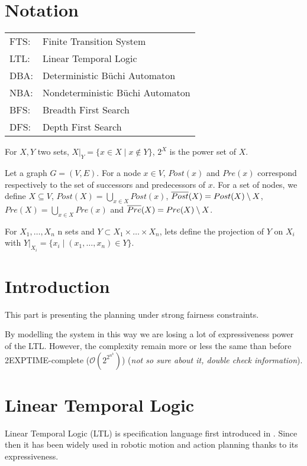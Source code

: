 \section*{Notation}
\begin{tabular}{ll}
FTS:& Finite Transition System\\
LTL:& Linear Temporal Logic\\
DBA:& Deterministic B\"uchi Automaton\\
NBA:& Nondeterministic B\"uchi Automaton\\
BFS:& Breadth First Search\\
DFS:& Depth First Search\\
\end{tabular}

For $X,Y$ two sets, $X|_Y = \{x \in X \mid x \notin  Y \}$, $2^X$ is the power set of $X$.

Let a graph $G = (V,E)$.
For a node $x \in V$, $Post(x)$ and $Pre(x)$ correspond respectively to the set of successors and predecessors of $x$. 
For a set of nodes, we define $X \subseteq V$, $Post(X) = \bigcup_{x \in X} Post(x)$, $\overline{Post} (X) = Post(X) \setminus X$, $Pre(X) = \bigcup_{x \in X} Pre(x)$ and $\overline{Pre} (X) = Pre(X) \setminus X$.

For $X_1,\dots,X_n$ n sets and $Y \subset X_1 \times \dots \times X_n$, lets define the projection of $Y$ on $X_i$ with $Y|_{X_i} = \{x_i \mid (x_1,\dots,x_n) \in Y\}$.

\section{Introduction}

This part is presenting the planning under strong fairness constraints.

\cite{de2010generalized}
\cite{patrizi2013fair}


By modelling the system in this way we are losing a lot of expressiveness power of the LTL. However, the complexity remain more or less the same than before 2EXPTIME-complete ($\mathcal{O}(2^{2^{n^k}})$) (\textit{not so sure about it, double check information}).

\section{Linear Temporal Logic}
Linear Temporal Logic (LTL) is specification language first introduced in \cite{pnueli1977temporal}. Since then it has been widely used in robotic motion and action planning thanks to its expressiveness.

